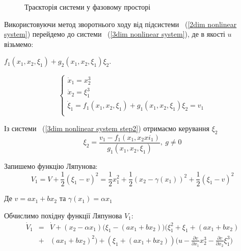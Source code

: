 \documentclass{article}
\begin{document}
\begin{figure}[]
    \caption{Траєкторія системи у фазовому просторі}
    \label{fig:image3}
\end{figure}

\pagebreak

Використовуючи метод зворотнього ходу від підсистеми ~(\ref{2dim nonlinear system}) 
перейдемо до системи   ~(\ref{3dim nonlinear system}), де  в якості $u$ візьмемо:

$f_1(x_1,x_2,\xi_1)+g_2(x_1,x_2,\xi_1)\xi_2$.

\begin{equation} \label{3dim nonlinear system step2}
    \begin{cases}
        \dot x_1 = x_2^3 \\
        \dot x_2 = \xi_1^3\\
        \dot \xi_1 =f_1(x_1,x_2,\xi_1)+g_1(x_1,x_2,\xi_1)\xi_2 = v_1\\
        \end{cases}
\end{equation}

Із системи ~(\ref{3dim nonlinear system step2}) отримаємо керування $\xi_2$ 
\begin{equation}
    \xi_2 = \frac{v_1-f_1(x_1,x_2xi_1)}{g_1(x_1,x_2,\xi_{1})}, ~g \neq 0
\end{equation}

Запишемо функцію Ляпунова:
\begin{equation}
    V_1 = V+\frac{1}{2}(\xi_1-v)^2=\frac{1}{2}x_1^2+\frac{1}{2}(x_2-\gamma(x_1))^2+
    \frac{1}{2}(\xi_1-v)^2
\end{equation}

Де $v = ax_1+bx_2$ та $\gamma(x_1) = \alpha x_1$

Обчислимо похідну функції Ляпунова $V_1$:
\begin{eqnarray}
    \dot V_1 &=& \dot V + (x_2-\alpha x_1) \Big( \xi_1-(ax_1+bx_2) \Big)
    \Big( \xi_1^2+\xi_1+(ax_1+bx_2) \nonumber \\ &+&(ax_1+bx_2)^2 \Big)
    +(\xi_1+(ax_1+bx_2))
    \Big(u-\frac{\partial v}{\partial x_1}x_{2}^3 
    - \frac{\partial v}{\partial x_2}\xi_{1}^3 \Big)
\end{eqnarray}
\end{document}
